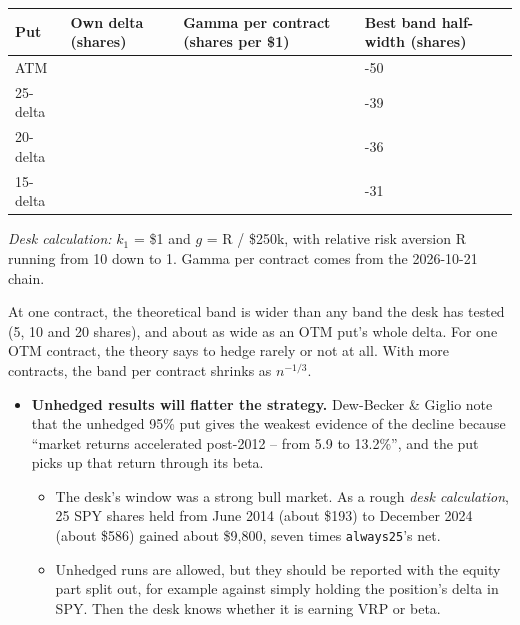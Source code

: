 \documentclass{article}
\begin{document}
\begin{center}\small
\begin{tabularx}{\linewidth}{l >{\raggedright\arraybackslash}X >{\raggedright\arraybackslash}X >{\raggedright\arraybackslash}X}
\toprule
\textbf{Put} & \textbf{Own delta (shares)} & \textbf{Gamma per contract (shares per \$1)} & \textbf{Best band half-width (shares)} \\
\midrule
ATM & 50 & 1.42 & 28-50 \\
25-delta & 25 & 0.88 & 22-39 \\
20-delta & 20 & 0.74 & 20-36 \\
15-delta & 15 & 0.57 & 18-31 \\
\bottomrule
\end{tabularx}
\end{center}

\emph{Desk calculation:} $k_1$ = \$1 and $g$ = R /\allowbreak{} \$250k, with relative risk aversion R running from 10 down to 1. Gamma per contract comes from the 2026-10-21 chain.

At one contract, the theoretical band is wider than any band the desk has tested (5, 10 and 20 shares), and about as wide as an OTM put's whole delta. For one OTM contract, the theory says to hedge rarely or not at all. With more contracts, the band per contract shrinks as $n^{-1/3}$.

\begin{itemize}

\item \textbf{Unhedged results will flatter the strategy.} Dew-Becker \& Giglio note that the unhedged 95\% put gives the weakest evidence of the decline because ``market returns accelerated post-2012 -- from 5.9 to 13.2\%'', and the put picks up that return through its beta.

\begin{itemize}

\item The desk's window was a strong bull market. As a rough \emph{desk calculation}, 25 SPY shares held from June 2014 (about \$193) to December 2024 (about \$586) gained about \$9,800, seven times \texttt{always25}'s net.

\item Unhedged runs are allowed, but they should be reported with the equity part split out, for example against simply holding the position's delta in SPY. Then the desk knows whether it is earning VRP or beta.

\end{itemize}

\end{itemize}
\end{document}
